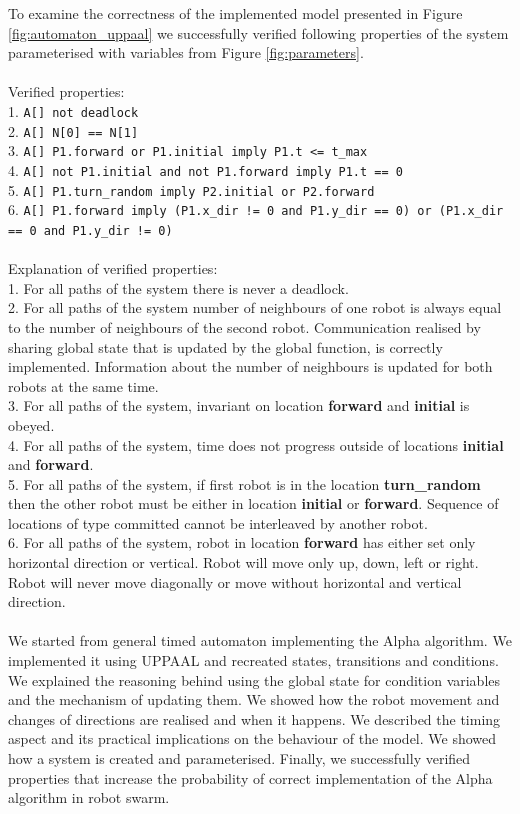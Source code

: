 \noindent
To examine the correctness of the implemented model presented in Figure \ref{fig:automaton_uppaal} we successfully verified following properties of the system parameterised with variables from Figure \ref{fig:parameters}.\\\\
Verified properties:\\
1. \texttt{A[] not deadlock}\\
2. \texttt{A[] N[0] == N[1]}\\
3. \texttt{A[] P1.forward or P1.initial imply P1.t <= t\_max}\\
4. \texttt{A[] not P1.initial and not P1.forward imply P1.t == 0}\\
5. \texttt{A[] P1.turn\_random imply P2.initial or P2.forward}\\
6. \texttt{A[] P1.forward imply (P1.x\_dir != 0 and P1.y\_dir == 0) or (P1.x\_dir == 0 and P1.y\_dir != 0)}\\\\
Explanation of verified properties:\\
1. For all paths of the system there is never a deadlock.\\
2. For all paths of the system number of neighbours of one robot is always equal to the number of neighbours of the second robot. Communication realised by sharing global state that is updated by the global function, is correctly implemented. Information about the number of neighbours is updated for both robots at the same time.\\
3. For all paths of the system, invariant on location \textbf{forward} and \textbf{initial} is obeyed.\\
4. For all paths of the system, time does not progress outside of locations \textbf{initial} and \textbf{forward}.\\
5. For all paths of the system, if first robot is in the location \textbf{turn\_random} then the other robot must be either in location \textbf{initial} or \textbf{forward}. Sequence of locations of type committed cannot be interleaved by another robot.\\
6. For all paths of the system, robot in location \textbf{forward} has either set only horizontal direction or vertical. Robot will move only up, down, left or right. Robot will never move diagonally or move without horizontal and vertical direction.\\\\
\noindent
We started from general timed automaton implementing the Alpha algorithm. We implemented it using UPPAAL and recreated states, transitions and conditions. We explained the reasoning behind using the global state for condition variables and the mechanism of updating them. We showed how the robot movement and changes of directions are realised and when it happens. We described the timing aspect and its practical implications on the behaviour of the model. We showed how a system is created and parameterised. Finally, we successfully verified properties that increase the probability of correct implementation of the Alpha algorithm in robot swarm.